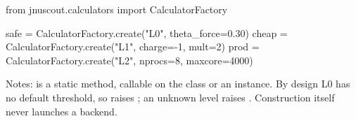 \begin{codeblock}
from jnuscout.calculators import CalculatorFactory

safe = CalculatorFactory.create("L0", theta_force=0.30)
cheap = CalculatorFactory.create("L1", charge=-1, mult=2)
prod = CalculatorFactory.create("L2", nprocs=8, maxcore=4000)
\end{codeblock}

Notes:  is a static method, callable on the class or an
instance.  By design L0 has no default threshold, so
 raises ; an unknown
level raises .  Construction itself never launches a
backend.
